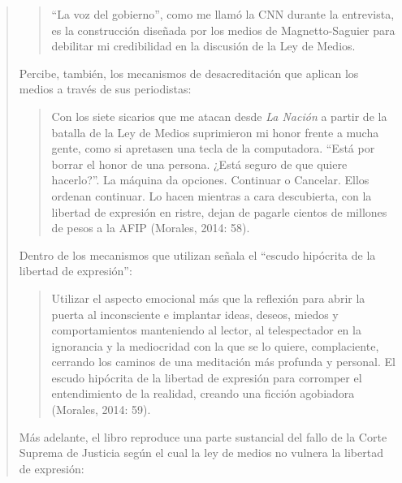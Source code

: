 \begin{quote}
\begin{quote}
	\enquote{La voz del gobierno}, como me llamó la CNN durante la entrevista, es la construcción diseñada por los medios de Magnetto-Saguier para debilitar mi credibilidad en la discusión de la Ley de Medios.
\end{quote}


Percibe, también, los mecanismos de desacreditación que aplican los medios a través de sus periodistas:

\begin{quote}
	Con los siete sicarios que me atacan desde \emph{La Nación }a partir de la batalla de la Ley de Medios suprimieron mi honor frente a mucha gente, como si apretasen una tecla de la computadora. \enquote{Está por borrar el honor de una persona. ¿Está seguro de que quiere hacerlo?}. La máquina da opciones. Continuar o Cancelar. Ellos ordenan continuar. Lo hacen mientras a cara descubierta, con la libertad de expresión en ristre, dejan de pagarle cientos de millones de pesos a la AFIP (Morales, 2014: 58).
\end{quote}


Dentro de los mecanismos que utilizan señala el \enquote{escudo hipócrita de la libertad de expresión}:

\begin{quote}
	Utilizar el aspecto emocional más que la reflexión para abrir la puerta al inconsciente e implantar ideas, deseos, miedos y comportamientos manteniendo al lector, al telespectador en la ignorancia y la mediocridad con la que se lo quiere, complaciente, cerrando los caminos de una meditación más profunda y personal. El escudo hipócrita de la libertad de expresión para corromper el entendimiento de la realidad, creando una ficción agobiadora (Morales, 2014: 59).
\end{quote}


Más adelante, el libro reproduce una parte sustancial del fallo de la Corte Suprema de Justicia según el cual la ley de medios no vulnera la libertad de expresión:


\end{quote}
